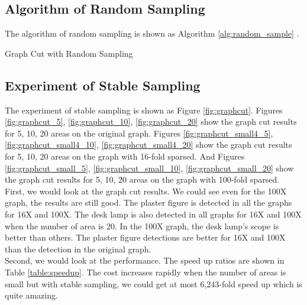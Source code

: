 \subsection{Algorithm of Random Sampling}
The algorithm of random sampling is shown as Algorithm \ref{alg:random_sample} .
\begin{algorithm}[h!]                      %
\caption{Graph Cut with Random Sampling}          %
\label{alg:random_sample}                           %
\begin{algorithmic} [1]                   %
   \EndIf
 \EndFor
 \State {}
\end{algorithmic}
\end{algorithm}

\subsection{Experiment of Stable Sampling}

The experiment of stable sampling is shown as Figure \ref{fig:graphcut}. Figures \ref{fig:graphcut_5}, \ref{fig:graphcut_10}, \ref{fig:graphcut_20} show the graph cut results for 5, 10, 20 areas on the original graph. Figures \ref{fig:graphcut_small4_5}, \ref{fig:graphcut_small4_10}, \ref{fig:graphcut_small4_20} show the graph cut results for 5, 10, 20 areas on the graph with 16-fold sparsed. And Figures \ref{fig:graphcut_small_5}, \ref{fig:graphcut_small_10}, \ref{fig:graphcut_small_20} show the graph cut results for 5, 10, 20 areas on the graph with 100-fold sparsed.\\
First, we would look at the graph cut results. We could see even for the 100X graph, the results are still good. The plaster figure is detected in all the graphs for 16X and 100X. The desk lamp is also detected in all graphs for 16X and 100X when the number of area is 20. In the 100X graph, the desk lamp's scope is better than others. The plaster figure detections are better for 16X and 100X than the detection in the original graph. \\
Second, we would look at the performance. The speed up ratios are shown in Table \ref{table:speedup}. The cost increases rapidly when the number of areas is small but with stable sampling, we could get at most 6,243-fold speed up which is quite amazing.

